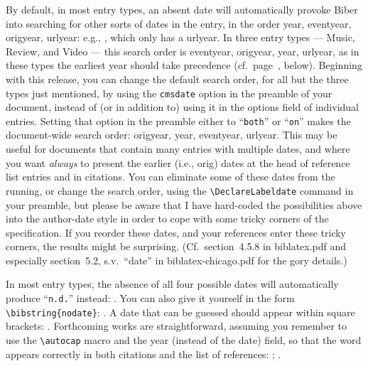 \documentclass[a4paper,12pt]{report}
\newcommand{\cmd}[1]{\texttt{\textbackslash #1}}
\begin{document}
By default, in most entry types, an absent \textsf{date} will
automatically provoke \textsf{Biber} into searching for other sorts of
dates in the entry, in the order \textsf{year, eventyear, origyear,
  urlyear}: e.g., \autocite{evanston:library}, which only has a
\textsf{urlyear}.  In three entry types --- \textsf{Music},
\textsf{Review}, and \textsf{Video} --- this search order is
\textsf{eventyear, origyear, year, urlyear}, as in these types the
earliest year should take precedence (cf.\
page~\pageref{sec:audiovisual}, below).  Beginning with this release,
you can change the default search order, for all but the three types
just mentioned, by using the \texttt{cmsdate} option in the preamble
of your document, instead of (or in addition to) using it in the
\textsf{options} field of individual entries.  Setting that option in
the preamble either to \enquote{\texttt{both}} or
\enquote{\texttt{on}} makes the document-wide search order:
\textsf{origyear, year, eventyear, urlyear}.  This may be useful for
documents that contain many entries with multiple dates, and where you
want \emph{always} to present the earlier (i.e., \textsf{orig}) dates
at the head of reference list entries and in citations.  You can
eliminate some of these dates from the running, or change the search
order, using the \cmd{DeclareLabeldate} command in your preamble, but
please be aware that I have hard-coded the possibilities above into
the author-date style in order to cope with some tricky corners of the
specification.  If you reorder these dates, and your references enter
these tricky corners, the results might be surprising.  (Cf.\
section~4.5.8 in \textsf{biblatex.pdf} and especially section~5.2,
s.v.\ \enquote{\textsf{date}} in \textsf{biblatex-chicago.pdf} for the
gory details.)

In most entry types, the absence of all four possible dates will
automatically produce \mbox{\enquote{\texttt{n.d.}\hspace{-2pt}}}
instead: \autocite{bernstein:shostakovich}.  You can also give it
yourself in the form \cmd{bibstring\{nodate\}}:
\autocite{ross:thesis}.  A date that can be guessed should appear
within square brackets: \autocite{clark:mesopot}.  Forthcoming works
are straightforward, assuming you remember to use the \cmd{autocap}
macro and the \textsf{year} (instead of the \textsf{date}) field, so
that the word appears correctly in both citations and the list of
references: \autocite{author:forthcoming}; \autocite{contrib:contrib}.
\end{document}
